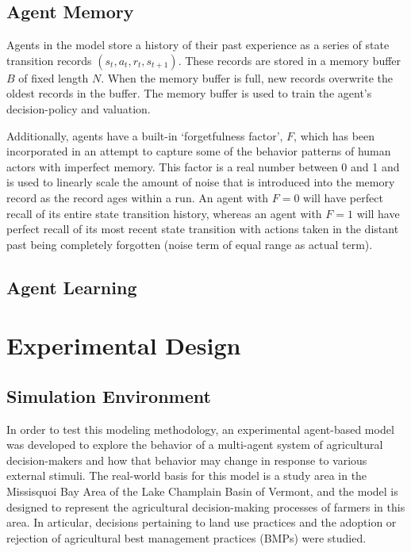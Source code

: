 \subsection{Agent Memory}
\label{subsec:farm_methods_memory}

Agents in the model store a history of their past experience as
a series of state transition records $(s_t,a_t,r_t,s_{t+1})$.
These records are stored in a memory buffer $B$ of fixed length $N$.
When the memory buffer is full, new records overwrite the oldest records in
the buffer.
The memory buffer is used to train the agent's decision-policy and valuation.

Additionally,
agents have a built-in `forgetfulness factor', $F$,
which has been incorporated in an attempt to capture some of the behavior
patterns of human actors with imperfect memory.
This factor is a real number between 0 and 1 and is used to linearly scale the
amount of noise that is introduced into the memory record as the record
ages within a run.
An agent with $F=0$ will have perfect recall of its entire state transition
history, whereas an agent with $F=1$ will have perfect recall of its most
recent state transition with actions taken in the distant past being
completely forgotten (noise term of equal range as actual term).

\subsection{Agent Learning}
\label{subsec:farm_methods_learning}


\section{Experimental Design}
\label{sec:farm_ex}

\subsection{Simulation Environment}
\label{subsec:farm_ex_env}

In order to test this modeling methodology,
an experimental agent-based model was developed to explore the behavior
of a multi-agent system of agricultural decision-makers
and how that behavior may change in response to various external stimuli.
The real-world basis for this model is a study area in the
Missisquoi Bay Area of the Lake Champlain Basin of Vermont,
and the model is designed to represent the agricultural decision-making
processes of farmers in this area.
In articular, decisions pertaining to land use practices and
the adoption or rejection of agricultural best management practices (BMPs)
were studied.


